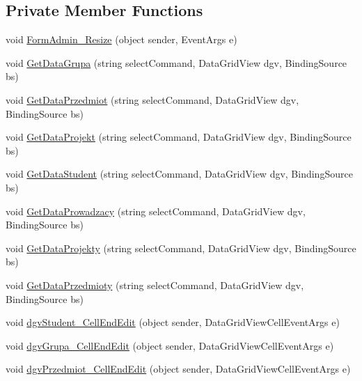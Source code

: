\subsection*{Private Member Functions}
\begin{DoxyCompactItemize}
\item 
void \hyperlink{class_dziennik_ocen_1_1_form_admin_a6f9e595eba987ac552ed9a539e046e0e}{Form\+Admin\+\_\+\+Resize} (object sender, Event\+Args e)
\item 
void \hyperlink{class_dziennik_ocen_1_1_form_admin_a30578c22b6800b08b088a6bce866cc89}{Get\+Data\+Grupa} (string select\+Command, Data\+Grid\+View dgv, Binding\+Source bs)
\item 
void \hyperlink{class_dziennik_ocen_1_1_form_admin_a1d5c0be82fed48ef5de771ecce613e0b}{Get\+Data\+Przedmiot} (string select\+Command, Data\+Grid\+View dgv, Binding\+Source bs)
\item 
void \hyperlink{class_dziennik_ocen_1_1_form_admin_a78cfb7e0267d3e80e20843d72ef29a16}{Get\+Data\+Projekt} (string select\+Command, Data\+Grid\+View dgv, Binding\+Source bs)
\item 
void \hyperlink{class_dziennik_ocen_1_1_form_admin_a3473aad7b3aff3e8542c2d87c73167d8}{Get\+Data\+Student} (string select\+Command, Data\+Grid\+View dgv, Binding\+Source bs)
\item 
void \hyperlink{class_dziennik_ocen_1_1_form_admin_af98b8f3bf331570a6d1215b13cf054ef}{Get\+Data\+Prowadzacy} (string select\+Command, Data\+Grid\+View dgv, Binding\+Source bs)
\item 
void \hyperlink{class_dziennik_ocen_1_1_form_admin_a43df04f474ae6762b971c1d1e57d0db3}{Get\+Data\+Projekty} (string select\+Command, Data\+Grid\+View dgv, Binding\+Source bs)
\item 
void \hyperlink{class_dziennik_ocen_1_1_form_admin_a60dde3b0c4b2b71927a15b9240f2a760}{Get\+Data\+Przedmioty} (string select\+Command, Data\+Grid\+View dgv, Binding\+Source bs)
\item 
void \hyperlink{class_dziennik_ocen_1_1_form_admin_a164792e99a2213c5e62870c2ffee0d31}{dgv\+Student\+\_\+\+Cell\+End\+Edit} (object sender, Data\+Grid\+View\+Cell\+Event\+Args e)
\item 
void \hyperlink{class_dziennik_ocen_1_1_form_admin_a3b95eb1c804963f3ea3b3650c71ea4f0}{dgv\+Grupa\+\_\+\+Cell\+End\+Edit} (object sender, Data\+Grid\+View\+Cell\+Event\+Args e)
\item 
void \hyperlink{class_dziennik_ocen_1_1_form_admin_adf080cf9bf6ce910be2b1b539c5c6bc2}{dgv\+Przedmiot\+\_\+\+Cell\+End\+Edit} (object sender, Data\+Grid\+View\+Cell\+Event\+Args e)

\end{DoxyCompactItemize}
